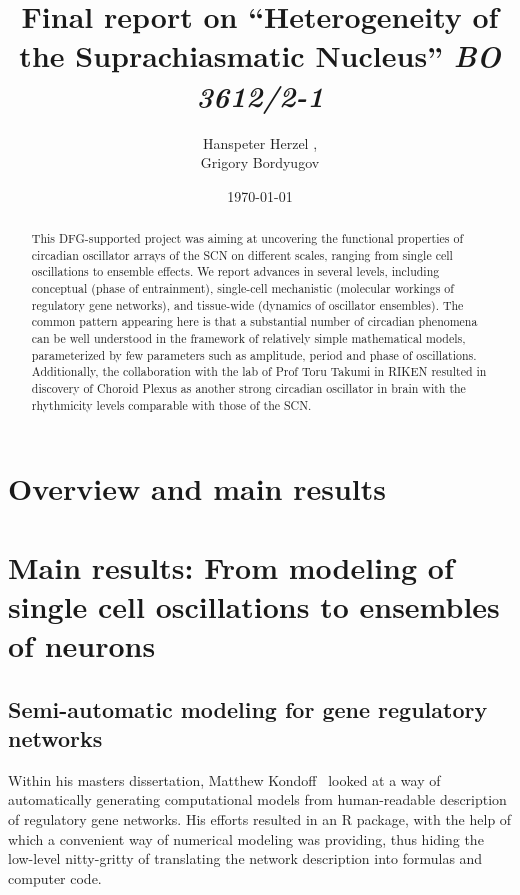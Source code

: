 \documentclass[a4paper]{article}
\title{Final report on ``Heterogeneity of the Suprachiasmatic
Nucleus'' {\em BO 3612/2-1}}
\author{Hanspeter Herzel  \mailhref{h.herzel@biologie.hu-berlin.de},\\
        Grigory Bordyugov \mailhref{grigory.bordyugov@gmail.com}}
\date{\today}
\begin{document}
\maketitle

\begin{abstract}
  This DFG-supported project was aiming at uncovering the functional
  properties of circadian oscillator arrays of the SCN on different
  scales, ranging from single cell oscillations to ensemble effects.
  We report advances in several levels, including conceptual (phase of
  entrainment), single-cell mechanistic (molecular workings of
  regulatory gene networks), and tissue-wide (dynamics of oscillator
  ensembles). The common pattern appearing here is that a substantial
  number of circadian phenomena can be well understood in the
  framework of relatively simple mathematical models, parameterized by
  few parameters such as amplitude, period and phase of oscillations.
  Additionally, the collaboration with the lab of Prof Toru Takumi in
  RIKEN resulted in discovery of Choroid Plexus as another strong
  circadian oscillator in brain with the rhythmicity levels comparable
  with those of the SCN.
\end{abstract}

\tableofcontents

\section{Overview and main results}

\section{Main results: From modeling of single cell oscillations to
ensembles of neurons}

\subsection{Semi-automatic modeling for gene regulatory networks}
Within his masters dissertation, Matthew
Kondoff~\cite{kondoff2015modeling} looked at a way of automatically
generating computational models from human-readable description of
regulatory gene networks. His efforts resulted in an R package, with
the help of which a convenient way of numerical modeling was
providing, thus hiding the low-level nitty-gritty of translating the
network description into formulas and computer code.
\end{document}
